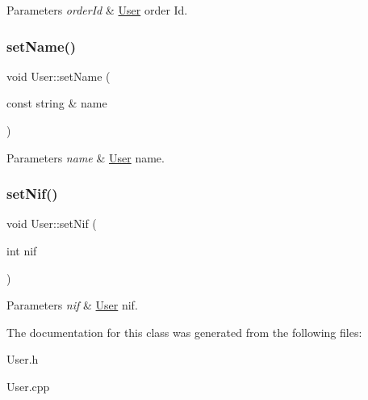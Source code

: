 \begin{DoxyParams}{Parameters}
{\em order\+Id} & \hyperlink{class_user}{User} order Id. \\
\hline
\end{DoxyParams}
\mbox{\label{class_user_ac44eb16e566dd060399e8f87ceec3fac}} 
\subsubsection{\texorpdfstring{set\+Name()}{setName()}}
{\footnotesize\ttfamily void User\+::set\+Name (\begin{DoxyParamCaption}\item[{const string \&}]{name }\end{DoxyParamCaption})}


\begin{DoxyParams}{Parameters}
{\em name} & \hyperlink{class_user}{User} name. \\
\hline
\end{DoxyParams}
\mbox{\label{class_user_a31dd2dcc59d3123cd71dc87fb97c701f}} 
\subsubsection{\texorpdfstring{set\+Nif()}{setNif()}}
{\footnotesize\ttfamily void User\+::set\+Nif (\begin{DoxyParamCaption}\item[{int}]{nif }\end{DoxyParamCaption})}


\begin{DoxyParams}{Parameters}
{\em nif} & \hyperlink{class_user}{User} nif. \\
\hline
\end{DoxyParams}


The documentation for this class was generated from the following files\+:\begin{DoxyCompactItemize}
\item 
User.\+h\item 
User.\+cpp\end{DoxyCompactItemize}
